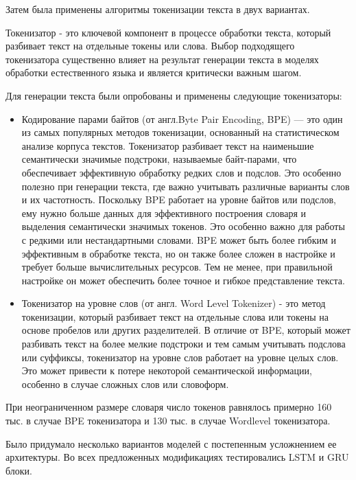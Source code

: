 \documentclass[a4paper,12pt]{extarticle}
\begin{document}
Затем была применены алгоритмы токенизации текста в двух вариантах.

Токенизатор - это ключевой компонент в процессе обработки текста, который разбивает текст на отдельные токены или слова. Выбор подходящего токенизатора существенно влияет на результат генерации текста в моделях обработки естественного языка и является критически важным шагом.

Для генерации текста были опробованы и применены следующие токенизаторы:
\begin{itemize}
	\item Кодирование парами байтов (от англ.Byte Pair Encoding, BPE) — это один из самых популярных методов токенизации, основанный на статистическом анализе корпуса текстов. Токенизатор разбивает текст на наименьшие семантически значимые подстроки, называемые байт-парами, что обеспечивает эффективную обработку редких слов и подслов. Это особенно полезно при генерации текста, где важно учитывать различные варианты слов и их частотность. Поскольку BPE работает на уровне байтов или подслов, ему нужно больше данных для эффективного построения словаря и выделения семантически значимых токенов. Это особенно важно для работы с редкими или нестандартными словами. BPE может быть более гибким и эффективным в обработке текста, но он также более сложен в настройке и требует больше вычислительных ресурсов. Тем не менее, при правильной настройке он может обеспечить более точное и гибкое представление текста.
	\item Токенизатор на уровне слов (от англ. Word Level Tokenizer) - это метод токенизации, который разбивает текст на отдельные слова или токены на основе пробелов или других разделителей. В отличие от BPE, который может разбивать текст на более мелкие подстроки и тем самым учитывать подслова или суффиксы, токенизатор на уровне слов работает на уровне целых слов. Это может привести к потере некоторой семантической информации, особенно в случае сложных слов или словоформ.
\end{itemize}
При неограниченном размере словаря число токенов равнялось примерно 160 тыс. в случае BPE токенизатора и 130 тыс. в случае Wordlevel токенизатора.

Было придумало несколько вариантов моделей с постепенным усложнением ее архитектуры. Во всех предложенных модификациях тестировались LSTM и GRU блоки.
\end{document}
